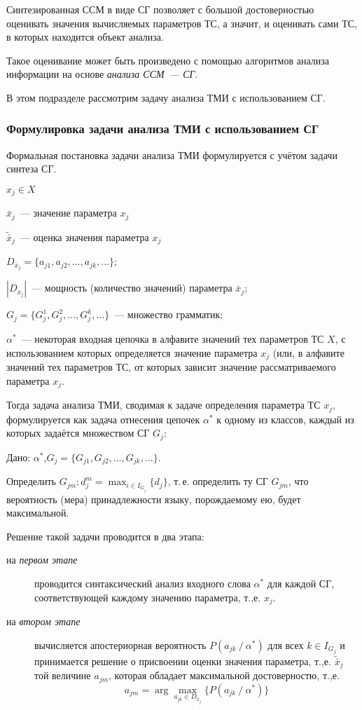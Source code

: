 Синтезированная ССМ в виде СГ позволяет с большой достоверностью
оценивать значения вычисляемых параметров ТС, а значит, и оценивать
сами ТС, в которых находится объект анализа.

Такое оценивание может быть произведено с помощью алгоритмов анализа
информации на основе \emph{анализа ССМ~--- СГ}.

В этом подразделе рассмотрим задачу анализа ТМИ с использованием СГ.


\subsubsection{Формулировка задачи анализа ТМИ с использованием СГ}

Формальная постановка задачи анализа ТМИ формулируется с учётом задачи
синтеза СГ.

$x_j \in X$

$\bar{x}_j$~--- значение параметра $x_j$

$\tilde{\bar{x}}_j$~--- оценка значения параметра $x_j$

$D_{\bar{x}_j}= \{a_{j1},a_{j2},\ldots,a_{jk},\ldots\}$;

$|D_{\bar{x}_j}|$~--- мощность (количество значений) параметра
$\bar{x}_j$;

$G_j = \{G_j^1,G_j^2,\ldots,G_j^k,\ldots\}$~--- множество грамматик;

$\alpha^*$~--- некоторая входная цепочка в алфавите значений тех
параметров ТС $X$, с использованием которых определяется значение
параметра $x_j$ (или, в алфавите значений тех параметров ТС, от
которых зависит значение рассматриваемого параметра $x_j$.

Тогда задача анализа ТМИ, сводимая к задаче определения параметра ТС
$x_j$, формулируется как задача отнесения цепочек $\alpha^*$ к одному
из классов, каждый из которых задаётся множеством СГ $G_j$:

Дано: $\alpha^*$,\quad $G_j = \{G_{j1},G_{j2},\ldots,G_{jk},\ldots\}$.

Определить $G_{jm} \colon d_j^m = \max_{i \in I_{G_j}} \{d_j\}$,
т.\,е. определить ту СГ $G_{jm}$, что вероятность (мера)
принадлежности языку, порождаемому ею, будет максимальной.

Решение такой задачи проводится в два этапа:
\begin{description}
\item[на \emph{первом этапе}] проводится синтаксический анализ
  входного слова $\alpha^*$ для каждой СГ, соответствующей каждому
  значению параметра, т.,е. $x_j$.
\item[на \emph{втором этапе}] вычисляется апостериорная вероятность
  $P(a_{jk} \mathop{/} \alpha^*)$ для всех $k \in I_{G_j}$ и
  принимается решение о присвоении оценки значения параметра,
  т.,е. $\tilde{\bar{x}}_j$ той величине $a_{jm}$, которая обладает
  максимальной достоверностю, т.,е.
  \begin{equation*}
    a_{jm} = \arg \max_{a_{jk} \in D_{\bar{x}_j}} \{ P(a_{jk}
    \mathop{/} \alpha^*)\}
  \end{equation*}
\end{description}

